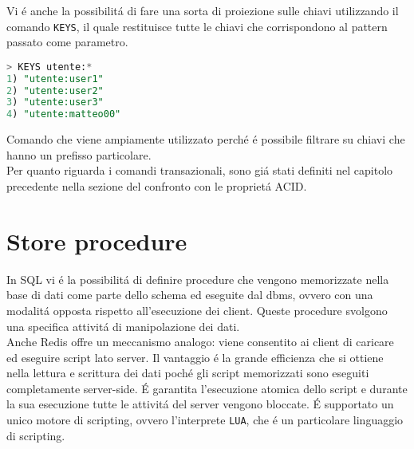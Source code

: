 Vi é anche la possibilitá di fare una sorta di proiezione sulle chiavi utilizzando il comando \texttt{KEYS}, il quale restituisce tutte le chiavi che corrispondono al pattern passato come parametro.
\begin{lstlisting}[autogobble, style=redis-cli, language=SQL]
> KEYS utente:*
1) "utente:user1"
2) "utente:user2"
3) "utente:user3"
4) "utente:matteo00"
\end{lstlisting}
Comando che viene ampiamente utilizzato perché é possibile filtrare su chiavi che hanno un prefisso particolare.\\

Per quanto riguarda i comandi transazionali, sono giá stati definiti nel capitolo precedente nella sezione del confronto con le proprietá ACID.

\section{Store procedure}
In SQL vi é la possibilitá di definire procedure che vengono memorizzate nella base di dati come parte dello schema ed eseguite dal dbms,
ovvero con una modalitá opposta rispetto all'esecuzione dei client. Queste procedure svolgono una specifica attivitá di manipolazione dei dati.\\
Anche Redis offre un meccanismo analogo: viene consentito ai client di caricare ed eseguire script lato server.
Il vantaggio é la grande efficienza che si ottiene nella lettura e scrittura dei dati poché gli script
memorizzati sono eseguiti completamente server-side.
É garantita l'esecuzione atomica dello script e durante la sua esecuzione tutte le attivitá del server vengono bloccate.
É supportato un unico motore di scripting, ovvero l'interprete \texttt{LUA}, che é un particolare linguaggio di scripting.

